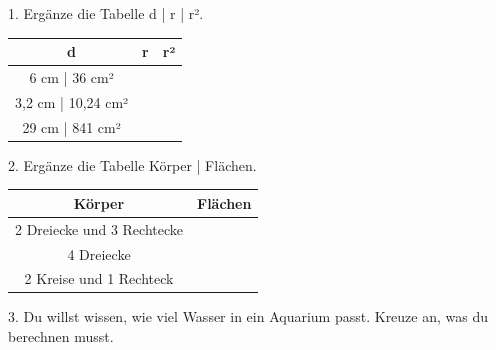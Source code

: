 \documentclass[11pt]{article}
\begin{document}
\pfheftstil
{}
\pfrueckblick
\begin{pfaufg}{}{1.}{}
Ergänze die Tabelle d | r | r².
\par\smallskip\noindent \begingroup\renewcommand{\arraystretch}{1.3}\begin{tabular}{|c|c|c|}\hline \textbf{d} & \textbf{r} & \textbf{r²} \\ \hline 6 cm | 36 cm² & \rule{0pt}{3ex}\hspace{1.6cm} & \rule{0pt}{3ex}\hspace{1.6cm} \\ \hline 3,2 cm | 10,24 cm² & \rule{0pt}{3ex}\hspace{1.6cm} & \rule{0pt}{3ex}\hspace{1.6cm} \\ \hline 29 cm | 841 cm² & \rule{0pt}{3ex}\hspace{1.6cm} & \rule{0pt}{3ex}\hspace{1.6cm} \\ \hline\end{tabular}\endgroup\par
{}
\end{pfaufg}
\begin{pfaufg}{}{2.}{}
Ergänze die Tabelle Körper | Flächen.
\par\smallskip\noindent \begingroup\renewcommand{\arraystretch}{1.3}\begin{tabular}{|c|c|}\hline \textbf{Körper} & \textbf{Flächen} \\ \hline 2 Dreiecke und 3 Rechtecke & \rule{0pt}{3ex}\hspace{1.6cm} \\ \hline 4 Dreiecke & \rule{0pt}{3ex}\hspace{1.6cm} \\ \hline 2 Kreise und 1 Rechteck & \rule{0pt}{3ex}\hspace{1.6cm} \\ \hline\end{tabular}\endgroup\par
{}
\end{pfaufg}
\pfgruppe{}
\begin{pfaufg}{}{3.}{}
Du willst wissen, wie viel Wasser in ein Aquarium passt. Kreuze an, was du berechnen musst.
\end{pfaufg}
\end{document}
